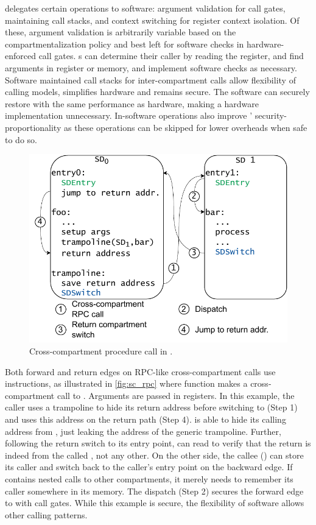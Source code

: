 \seccells delegates certain operations to software: 
argument validation for call gates, 
maintaining call stacks, and context switching for register context isolation.
Of these, argument validation is arbitrarily variable based on the
compartmentalization policy and best left for software checks in 
hardware-enforced call gates.
\secdiv{}s can determine their caller by reading the \rid 
register, and find arguments in register or memory, and implement
software checks as necessary.
Software maintained call stacks for inter-compartment calls 
allow flexibility of calling models,
simplifies hardware and remains secure.
The software can securely restore with the same performance as hardware,
making a hardware implementation unnecessary.
In-software operations also improve \seccells' security-proportionality
as these operations can be skipped for lower overheads when safe to do so.

\begin{figure}
  \centering
  \includegraphics[width=0.85\linewidth]{media/seccells/sc_rpc.pdf}
  \caption{Cross-compartment procedure call in \seccells.}
  \label{fig:sc_rpc}
\end{figure}

Both forward and return edges on RPC-like cross-compartment 
calls use \sdswitch instructions, as illustrated in \autoref{fig:sc_rpc} 
where function  makes a cross-compartment call to .
Arguments are passed in registers.
In this example, the caller uses a trampoline to hide its return address
before switching to  (Step 1) and uses this address on the 
return path (Step 4).
 is able to hide its calling address from , just
leaking the address of the generic trampoline.
Further, following the return switch to its entry point, 
can read \rid to verify that the return is indeed from the called 
\secdiv, not any other.
On the other side, the callee () can store its caller and
switch back to the caller's entry point on the backward edge.
If  contains nested calls to other compartments, it
merely needs to remember its caller somewhere in its memory.
The dispatch (Step 2) secures the forward edge to  with call
gates.
While this example is secure, the flexibility of software allows other
calling patterns.

